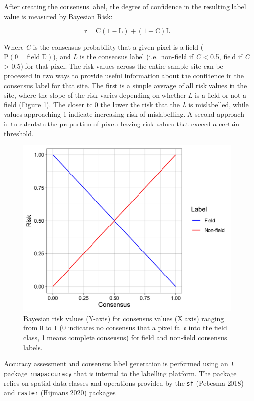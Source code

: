 \documentclass[
  11pt,
  a4paper]{article}
\begin{document}
After creating the consensus label, the degree of confidence in the
resulting label value is measured by Bayesian Risk:

\begin{equation} \label{eq:pixelrisk}
\mathrm{r=C(1 - L) + (1 - C)L}
\end{equation}

Where \emph{C} is the consensus probability that a given pixel is a
field (\(\mathrm{P(\theta = field|D)}\)), and \emph{L} is the consensus
label (i.e.~non-field if \emph{C} \textless{} 0.5, field if \emph{C}
\textgreater{} 0.5) for that pixel. The risk values across the entire
sample site can be processed in two ways to provide useful information
about the confidence in the consensus label for that site. The first is
a simple average of all risk values in the site, where the slope of the
risk varies depending on whether \emph{L} is a field or not a field
(Figure \ref{fig:riskcurve}). The closer to 0 the lower the risk that
the \emph{L} is mislabelled, while values approaching 1 indicate
increasing risk of mislabelling. A second approach is to calculate the
proportion of pixels having risk values that exceed a certain threshold.

\begin{figure}[!ht]

{\centering \includegraphics[width=0.7\linewidth,]{figures/si_label_risk} 

}

\caption{Bayesian risk values (Y-axis) for consensus values (X axis) ranging from 0 to 1 (0 indicates no consensus that a pixel falls into the field class, 1 means complete consensus) for field and non-field consensus labels.}\label{fig:riskcurve}
\end{figure}

Accuracy assessment and consensus label generation is performed using an
\texttt{R} package \texttt{rmapaccuracy} that is internal to the
labelling platform. The package relies on spatial data classes and
operations provided by the \texttt{sf} (Pebesma 2018) and
\texttt{raster} (Hijmans 2020) packages.
\end{document}
